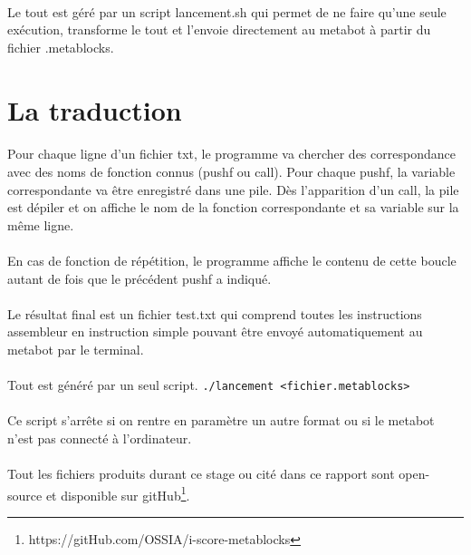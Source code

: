 \documentclass[10pt,a4paper]{report}
\begin{document}
\paragraph{}
Le tout est géré par un script lancement.sh qui permet de ne faire qu'une seule exécution, transforme le tout et l'envoie directement au metabot à partir du fichier .metablocks.

\paragraph{}
\section{La traduction}
\paragraph{}
Pour chaque ligne d'un fichier txt, le programme va chercher des correspondance avec des noms de fonction connus (pushf ou call). Pour chaque pushf, la variable correspondante va être enregistré dans une pile. Dès l'apparition d'un call, la pile est dépiler et on affiche le nom de la fonction correspondante et sa variable sur la même ligne.
\paragraph{}
En cas de fonction de répétition, le programme affiche le contenu de cette boucle autant de fois que le précédent pushf a indiqué.
\paragraph{}
Le résultat final est un fichier test.txt qui comprend toutes les instructions assembleur en instruction simple pouvant être envoyé automatiquement au metabot par le terminal.
\paragraph{}
Tout est généré par un seul script.
\texttt{./lancement <fichier.metablocks>}
\paragraph{}
Ce script s'arrête si on rentre en paramètre un autre format ou si le metabot n'est pas connecté à l'ordinateur.
\paragraph{}
Tout les fichiers produits durant ce stage ou cité dans ce rapport sont open-source et disponible sur  gitHub\footnote{https://gitHub.com/OSSIA/i-score-metablocks}.
\end{document}
